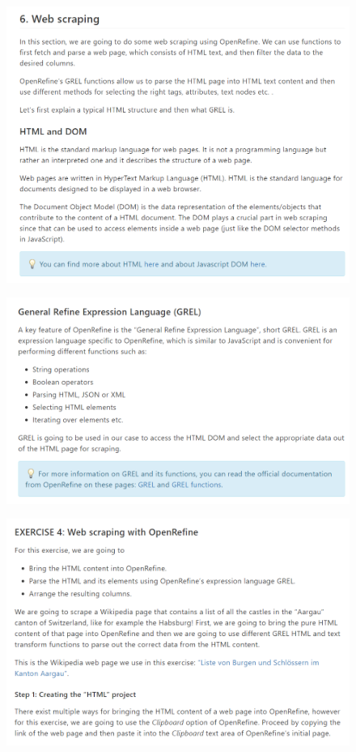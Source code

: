 \begin{figure}[H]
    \includegraphics[width=\linewidth]{./Figures/Appendices/worksheet/49.png}
\end{figure}
\begin{figure}[H]
    \includegraphics[width=\linewidth]{./Figures/Appendices/worksheet/50.png}
\end{figure}
\begin{figure}[H]
    \includegraphics[width=\linewidth]{./Figures/Appendices/worksheet/51.png}
\end{figure}
